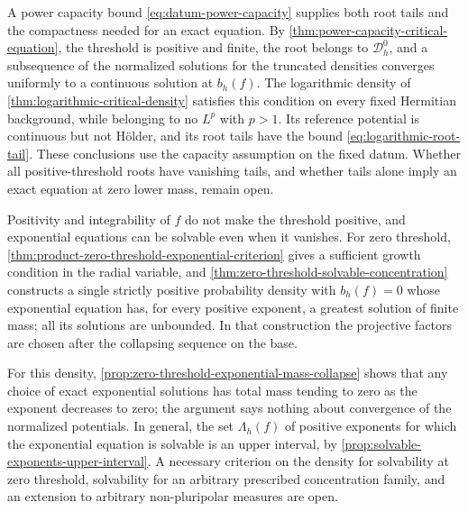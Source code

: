 A power capacity bound \eqref{eq:datum-power-capacity} supplies both root tails and the compactness needed for an exact equation. By \cref{thm:power-capacity-critical-equation}, the threshold is positive and finite, the root belongs to $\mathcal D_h^0$, and a subsequence of the normalized solutions for the truncated densities converges uniformly to a continuous solution at $b_h(f)$. The logarithmic density of \cref{thm:logarithmic-critical-density} satisfies this condition on every fixed Hermitian background, while belonging to no $L^p$ with $p>1$. Its reference potential is continuous but not H\"older, and its root tails have the bound \eqref{eq:logarithmic-root-tail}. These conclusions use the capacity assumption on the fixed datum. Whether all positive-threshold roots have vanishing tails, and whether tails alone imply an exact equation at zero lower mass, remain open.

Positivity and integrability of $f$ do not make the threshold positive, and exponential equations can be solvable even when it vanishes. For zero threshold, \cref{thm:product-zero-threshold-exponential-criterion} gives a sufficient growth condition in the radial variable, and \cref{thm:zero-threshold-solvable-concentration} constructs a single strictly positive probability density with $b_h(f)=0$ whose exponential equation has, for every positive exponent, a greatest solution of finite mass; all its solutions are unbounded. In that construction the projective factors are chosen after the collapsing sequence on the base.

For this density, \cref{prop:zero-threshold-exponential-mass-collapse} shows that any choice of exact exponential solutions has total mass tending to zero as the exponent decreases to zero; the argument says nothing about convergence of the normalized potentials. In general, the set $\Lambda_h(f)$ of positive exponents for which the exponential equation is solvable is an upper interval, by \cref{prop:solvable-exponents-upper-interval}. A necessary criterion on the density for solvability at zero threshold, solvability for an arbitrary prescribed concentration family, and an extension to arbitrary non-pluripolar measures are open.

